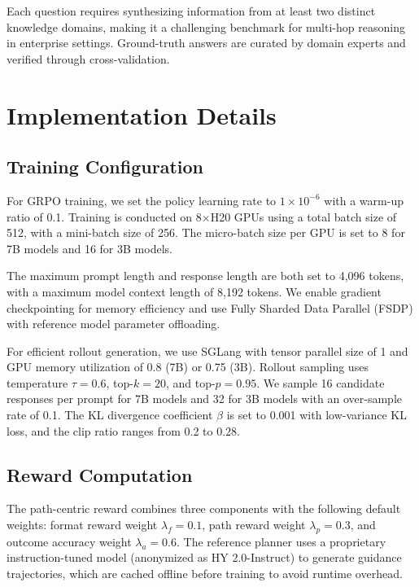 \documentclass[11pt]{article}
\begin{document}
Each question requires synthesizing information from at least two distinct knowledge domains, making it a challenging benchmark for multi-hop reasoning in enterprise settings. Ground-truth answers are curated by domain experts and verified through cross-validation.

\section{Implementation Details}
\label{sec:appendix_impl}

\subsection{Training Configuration}

For GRPO training, we set the policy learning rate to $1 \times 10^{-6}$ with a warm-up ratio of 0.1. Training is conducted on 8$\times$H20 GPUs using a total batch size of 512, with a mini-batch size of 256. The micro-batch size per GPU is set to 8 for 7B models and 16 for 3B models.

The maximum prompt length and response length are both set to 4,096 tokens, with a maximum model context length of 8,192 tokens. We enable gradient checkpointing for memory efficiency and use Fully Sharded Data Parallel (FSDP) with reference model parameter offloading.

For efficient rollout generation, we use SGLang with tensor parallel size of 1 and GPU memory utilization of 0.8 (7B) or 0.75 (3B). Rollout sampling uses temperature $\tau = 0.6$, top-$k = 20$, and top-$p = 0.95$. We sample 16 candidate responses per prompt for 7B models and 32 for 3B models with an over-sample rate of 0.1. The KL divergence coefficient $\beta$ is set to 0.001 with low-variance KL loss, and the clip ratio ranges from 0.2 to 0.28.

\subsection{Reward Computation}

The path-centric reward combines three components with the following default weights: format reward weight $\lambda_f = 0.1$, path reward weight $\lambda_p = 0.3$, and outcome accuracy weight $\lambda_a = 0.6$. The reference planner uses a proprietary instruction-tuned model (anonymized as HY 2.0-Instruct) to generate guidance trajectories, which are cached offline before training to avoid runtime overhead.
\end{document}
